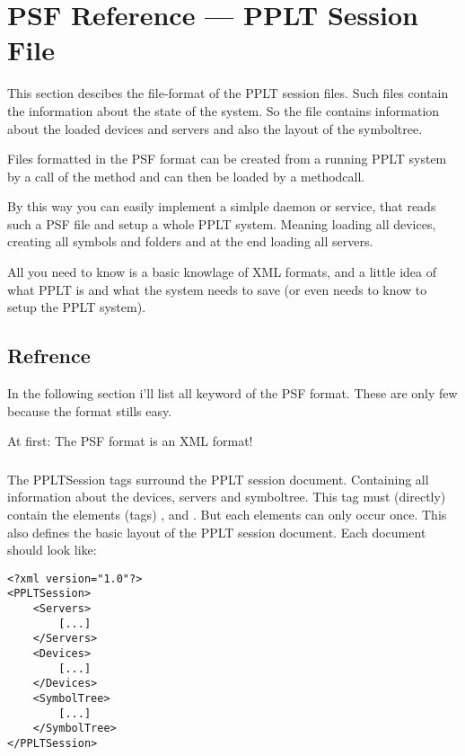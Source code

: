 \newcommand{\PSFTag}[1]{\indexii{PSF Element}{#1}}



\chapter{PSF Reference --- \textbf{P}PLT \textbf{S}ession \textbf{F}ile}

This section descibes the file-format of the PPLT session files. Such 
files contain the information about the state of the system. 
So the file contains information about the loaded devices and servers and
also the layout of the symboltree.

Files formatted in the PSF format can be created from a running PPLT system by 
a call of the method  and can then be loaded by a 
 methodcall.

By this way you can easily implement a simlple daemon or service, that reads 
such a PSF file and setup a whole PPLT system. Meaning loading all devices, 
creating all symbols and folders and at the end loading all servers.

All you need to know is a basic knowlage of XML formats, and a little idea of 
what PPLT is and what the system needs to save (or even needs to know to setup
the PPLT system). 

\section{Refrence}
In the following section i'll list all keyword of the PSF format. These are only few
because the format stills easy. 

At first: The PSF format is an XML format!

\subsection{}
\PSFTag{PPLTSession}
The PPLTSession tags surround the PPLT session document. Containing all 
information about the devices, servers and symboltree. This tag must
(directly) contain the elements (tags) , 
and . But each elements can only occur once.
This also defines the basic layout of the PPLT session document. Each document
should look like:
\begin{verbatim}
<?xml version="1.0"?>
<PPLTSession>
    <Servers>
        [...]
    </Servers>
    <Devices>
        [...]
    </Devices>
    <SymbolTree>
        [...]
    </SymbolTree>
</PPLTSession>
\end{verbatim}


